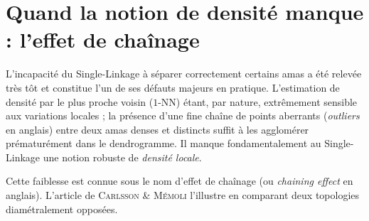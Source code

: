 

\section{Quand la notion de densité manque : l'effet de chaînage}

L'incapacité du Single-Linkage à séparer correctement certains amas a été relevée très tôt et constitue l'un de ses défauts majeurs en pratique. L'estimation de densité par le plus proche voisin ($1$-NN) étant, par nature, extrêmement sensible aux variations locales ; la présence d'une fine chaîne de points aberrants (\emph{outliers} en anglais) entre deux amas denses et distincts suffit à les agglomérer prématurément dans le dendrogramme. Il manque fondamentalement au Single-Linkage une notion robuste de \emph{densité locale}.


Cette faiblesse est connue sous le nom d'effet de chaînage (ou \emph{chaining effect} en anglais). L'article de \textsc{Carlsson} \& \textsc{Mémoli} \cite{CarlssonMemoli2010} l'illustre en comparant deux topologies diamétralement opposées.


